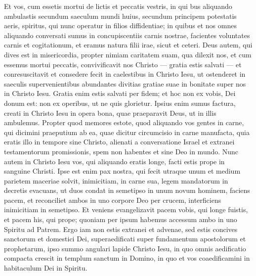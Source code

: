 \begin{biblechapter}  
\verse Et vos, cum essetis mortui de lictis et peccatis vestris, 
\verse in qui bus aliquando ambulastis secundum saeculum mundi huius, secundum principem potestatis aeris, spiritus, qui nunc operatur in filios diffidentiae; 
\verse in quibus et nos omnes aliquando conversati sumus in concupiscentiis carnis nostrae, facientes voluntates carnis et cogitationum, et eramus natura filii irae, sicut et ceteri. 
\verse Deus autem, qui dives est in misericordia, propter nimiam caritatem suam, qua dilexit nos, 
\verse et cum essemus mortui peccatis, convivificavit nos Christo — gratia estis salvati — 
\verse et conresuscitavit et consedere fecit in caelestibus in Christo Iesu, 
\verse ut ostenderet in saeculis supervenientibus abundantes divitias gratiae suae in bonitate super nos in Christo Iesu. 
\verse Gratia enim estis salvati per fidem; et hoc non ex vobis, Dei donum est: 
\verse non ex operibus, ut ne quis glorietur. 
\verse Ipsius enim sumus factura, creati in Christo Iesu in opera bona, quae praeparavit Deus, ut in illis ambulemus. 
\verse Propter quod memores estote, quod aliquando vos gentes in carne, qui dicimini praeputium ab ea, quae dicitur circumcisio in carne manufacta, 
\verse quia eratis illo in tempore sine Christo, alienati a conversatione Israel et extranei testamentorum promissionis, spem non habentes et sine Deo in mundo. 
\verse Nunc autem in Christo Iesu vos, qui aliquando eratis longe, facti estis prope in sanguine Christi. 
\verse Ipse est enim pax nostra, qui fecit utraque unum et medium parietem maceriae solvit, inimicitiam, in carne sua, 
\verse legem mandatorum in decretis evacuans, ut duos condat in semetipso in unum novum hominem, faciens pacem, 
\verse et reconciliet ambos in uno corpore Deo per crucem, interficiens inimicitiam in semetipso. 
\verse Et veniens evangelizavit pacem vobis, qui longe fuistis, et pacem his, qui prope; 
\verse quoniam per ipsum habemus accessum ambo in uno Spiritu ad Patrem. 
\verse Ergo iam non estis extranei et advenae, sed estis concives sanctorum et domestici Dei, 
\verse superaedificati super fundamentum apostolorum et prophetarum, ipso summo angulari lapide Christo Iesu, 
\verse in quo omnis aedificatio compacta crescit in templum sanctum in Domino, 
\verse in quo et vos coaedificamini in habitaculum Dei in Spiritu. 
\end{biblechapter}

